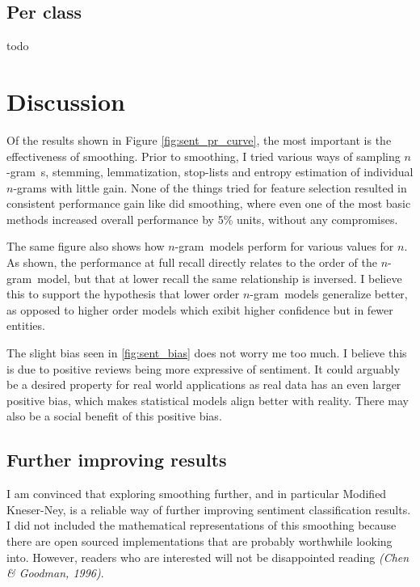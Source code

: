 \documentclass[a4paper,11pt]{kth-mag}
\newcommand{\ngram}{$n$-gram}
\newcommand{\ysc}{Modified Kneser-Ney classifier}
\begin{document}
\subsection{Per class}
todo


\newpage
\section{Discussion}
Of the results shown in Figure \ref{fig:sent_pr_curve}, the most important 
is the effectiveness of smoothing.
Prior to smoothing, I tried various ways of sampling \ngram~s, stemming, lemmatization, stop-lists and entropy estimation of individual \ngram s with little gain. None of the things tried for feature selection resulted in consistent performance gain like did smoothing, where even one of the most basic methods increased overall performance by 5\% units, without any compromises.

The same figure also shows how \ngram~models perform for various values for $n$.
As shown, the performance at full recall directly relates to the order of the
\ngram~model, but that at lower recall the same relationship is inversed. I believe this
to support the hypothesis that lower order \ngram~models generalize better, as opposed to higher order
models which exibit higher confidence but in fewer entities.



The slight bias seen in \ref{fig:sent_bias} does not worry me too much.
I believe this is due to positive reviews being more expressive of sentiment. It could arguably be a desired property for real world applications as real data has an even larger positive bias, which makes statistical models align better with reality. There may also be a social benefit of this positive bias.


\subsection{Further improving results}
I am convinced that exploring smoothing further, and in particular Modified Kneser-Ney,
is a reliable way of further improving sentiment classification results. I did not included the
mathematical representations of this smoothing because there are open sourced implementations
that are probably worthwhile looking into. However, readers who are interested will not
be disappointed reading \emph{(Chen \& Goodman, 1996)}.
\end{document}
